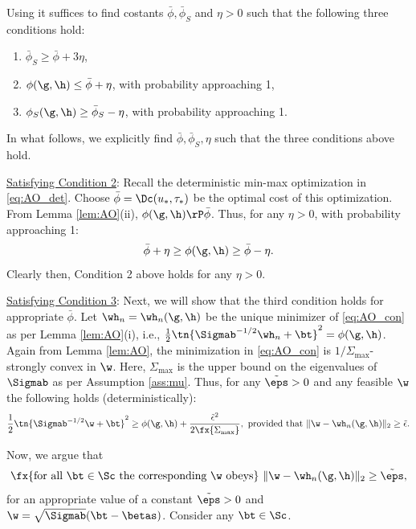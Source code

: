  Using \cite[Theorem 6.1(iii)]{thrampoulidis2018precise} it suffices to find costants $\bar\phi, \bar\phi_S$ and $\eta>0$ such that the following three conditions hold:
\begin{enumerate}
\item $\bar\phi_S \geq \bar\phi + 3\eta$,
\item $\phi(\g,\h) \leq \bar\phi + \eta$, with probability approaching 1,
\item $\phi_S(\g,\h) \geq \bar\phi_S - \eta$, with probability approaching 1.
\end{enumerate}
In what follows, we  explicitly find $\bar\phi, \bar\phi_S,\eta$ such that the three conditions above hold.

\vspace{5pt}
\noindent\underline{Satisfying Condition 2}: Recall the deterministic min-max optimization in \eqref{eq:AO_det}. Choose $\bar\phi=\Dc(u_*,\tau_*)$ be the optimal cost of this optimization. From Lemma \ref{lem:AO}(ii), $\phi(\g,\h)\rP\bar\phi$. Thus, for any $\eta>0$, with probability approaching 1:
\begin{align}\label{eq:phi_lim}
\bar\phi + \eta \geq \phi(\g,\h) \geq \bar\phi - \eta.
\end{align}
Clearly then, Condition 2 above holds for any $\eta>0$. 

\vspace{5pt}
\noindent\underline{Satisfying Condition 3}: Next, we will show that the third condition holds for appropriate $\bar\phi$. 
Let $\wh_n=\wh_n(\g,\h)$ be the unique minimizer of \eqref{eq:AO_con} as per Lemma \ref{lem:AO}(i), i.e., $\frac{1}{2}\tn{\Sigmab^{-1/2}\wh_n+\bt}^2 = \phi(\g,\h)$. Again from Lemma \ref{lem:AO}, the minimization in \eqref{eq:AO_con} is $1/\Sigma_{\max}$-strongly convex in $\w$. Here, $\Sigma_{\max}$ is the upper bound on the eigenvalues of $\Sigmab$ as per Assumption \ref{ass:mu}. Thus, for any $\tilde\eps>0$ and any feasible $\w$ the following holds (deterministically):
\begin{align}\label{eq:sc}
\frac{1}{2}\tn{\Sigmab^{-1/2}\w+\bt}^2 \geq \phi(\g,\h) + \frac{\tilde\epsilon^2}{2\fx{\Sigma_{\max}}},~\text{provided that}~ \|\w-\wh_n(\g,\h)\|_2 \geq \tilde\epsilon.
\end{align}

Now, we argue that 
\begin{align}\label{eq:dev_arg}
\fx{\text{for all}~\bt\in \Sc~\text{the corresponding}~\w~\text{obeys}}~\|\w-\wh_n(\g,\h)\|_2\geq \tilde\eps,
\end{align}
for an appropriate value of a constant $\tilde\eps>0$ and $\w=\sqrt{\Sigmab}(\bt-\betas)$. Consider any $\bt\in\Sc$. 

